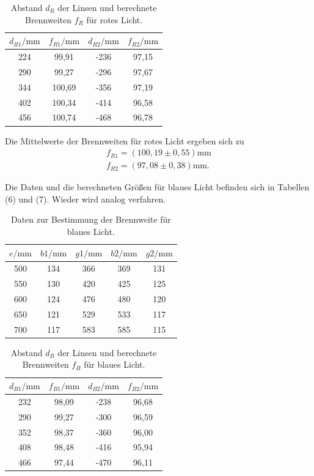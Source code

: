 \begin{table}[H]
\centering
\caption{Abstand $d_R$ der Linsen und berechnete Brennweiten $f_R$ für rotes Licht.}
\label{tab:einzel1}
\begin{tabular}{c c c c}
\toprule
$d_{R1}/\si{\milli\meter}$ & $f_{R1}/\si{\milli\meter}$ & $d_{R2}/\si{\milli\meter}$ & $f_{R2}/\si{\milli\meter}$ \\
\midrule
224 & 99,91 & -236 & 97,15\\
290 & 99,27 & -296 & 97,67\\
344 & 100,69 & -356 & 97,19\\
402 & 100,34 & -414 & 96,58\\
456 & 100,74 & -468 & 96,78\\
\bottomrule
\end{tabular}
\end{table}

Die Mittelwerte der Brennweiten für rotes Licht ergeben sich zu
\begin{align*}
f_{R1} = (100,19 \pm 0,55) \si{\milli\meter} \\
f_{R2} = (97,08 \pm 0,38) \si{\milli\meter} .
\end{align*}

 \noindent Die Daten und die berechneten Größen für blaues Licht befinden sich in Tabellen (6) und (7). Wieder wird analog verfahren.


\begin{table}[H]
\centering
\caption{Daten zur Bestimmung der Brennweite für blaues Licht.}
\label{tab:einzel1}
\begin{tabular}{c c c c c}
\toprule
$e/\si{\milli\meter}$ &$b1/\si{\milli\meter}$ & $g1/\si{\milli\meter}$ & $b2/\si{\milli\meter}$ & $g2/\si{\milli\meter}$ \\
\midrule
500 &134 & 366 & 369 & 131\\
550 &130 & 420 & 425 & 125\\
600 &124 & 476 & 480 & 120\\
650 &121 & 529 & 533 & 117\\
700 &117 & 583 & 585 & 115\\
\bottomrule
\end{tabular}
\end{table}

\begin{table}[H]
\centering
\caption{Abstand $d_B$ der Linsen und berechnete Brennweiten $f_B$ für blaues Licht.}
\label{tab:einzel1}
\begin{tabular}{c c c c}
\toprule
$d_{B1}/\si{\milli\meter}$ & $f_{B1}/\si{\milli\meter}$ & $d_{B2}/\si{\milli\meter}$ & $f_{B2}/\si{\milli\meter}$ \\
\midrule
232 & 98,09 & -238 & 96,68\\
290 & 99,27 & -300 & 96,59\\
352 & 98,37 & -360 & 96,00\\
408 & 98,48 & -416 & 95,94\\
466 & 97,44 & -470 & 96,11\\
\bottomrule
\end{tabular}
\end{table}

